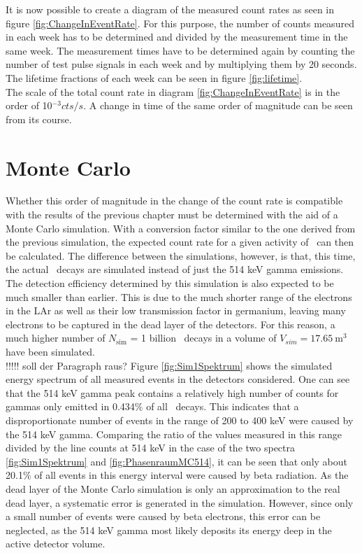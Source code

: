 \documentclass[encoding=utf8,british]{tumphthesis}
\begin{document}
It is now possible to create a diagram of the measured count rates as seen in figure \ref{fig:ChangeInEventRate}.
For this purpose, the number of counts measured in each week has to be determined and divided by the measurement time in the same week.
The measurement times have to be determined again by counting the number of test pulse signals in each week and by multiplying them by 20 seconds.
The lifetime fractions of each week can be seen in figure \ref{fig:lifetime}.
\\

The scale of the total count rate in diagram \ref{fig:ChangeInEventRate} is in the order of 10$^{-3} \unit{cts} / \unit{s}$.
A change in time of the same order of magnitude can be seen from its course.
\\

\section{Monte Carlo}
\label{sec:monteCarlo2}


Whether this order of magnitude in the change of the count rate is compatible with the results of the previous chapter must be determined with the aid of a Monte Carlo simulation.
With a conversion factor similar to the one derived from the previous simulation, the expected count rate for a given activity of \Kr\ can then be calculated.
The difference between the simulations, however, is that, this time, the actual \Kr\ decays are simulated instead of just the 514 keV gamma emissions.
\\

The detection efficiency determined by this simulation is also expected to be much smaller than earlier.
This is due to the much shorter range of the electrons in the LAr as well as their low transmission factor in germanium, leaving many electrons to be captured in the dead layer of the detectors.
For this reason, a much higher number of $N_{\mathrm{sim}}$ = 1 billion \Kr\ decays in a volume of $V_{sim} = 17.65 \ \mathrm{m}^3$ have been simulated.
\\

!!!!! soll der Paragraph raus?
Figure \ref{fig:Sim1Spektrum} shows the simulated energy spectrum of all measured events in the detectors considered.
One can see that the 514 keV gamma peak contains a relatively high number of counts for gammas only emitted in 0.434$\%$ of all \Kr\ decays.
This indicates that a disproportionate number of events in the range of 200 to 400 keV were caused by the 514 keV gamma.
Comparing the ratio of the values measured in this range divided by the line counts at 514 keV in the case of the two spectra \ref{fig:Sim1Spektrum} and \ref{fig:PhasenraumMC514}, it can be seen that only about 20.1$\%$ of all events in this energy interval were caused by beta radiation.
As the dead layer of the Monte Carlo simulation is only an approximation to the real dead layer, a systematic error is generated in the simulation.
However, since only a small number of events were caused by beta electrons, this error can be neglected, as the 514 keV gamma most likely deposits its energy deep in the active detector volume. 
\\
\end{document}
